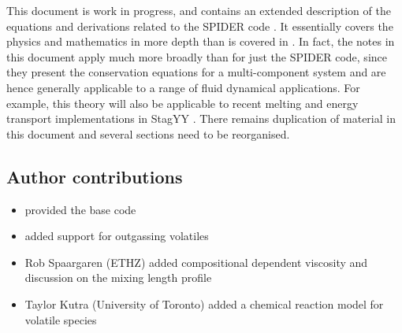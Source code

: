 This document is work in progress, and contains an extended description of the equations and derivations related to the SPIDER code \citep{BSW18}.  It essentially covers the physics and mathematics in more depth than is covered in \cite{ABE93,ABE95,BSW18}.  In fact, the notes in this document apply much more broadly than for just the SPIDER code, since they present the conservation equations for a multi-component system and are hence generally applicable to a range of fluid dynamical applications.  For example, this theory will also be applicable to recent melting and energy transport implementations in StagYY \citep{TACK08}.  There remains duplication of material in this document and several sections need to be reorganised.
\subsection{Author contributions}
\begin{itemize}
\item \cite{BSW18} provided the base code
\item \cite{BKW19} added support for outgassing volatiles
\item Rob Spaargaren (ETHZ) added compositional dependent viscosity and discussion on the mixing length profile
\item Taylor Kutra (University of Toronto) added a chemical reaction model for volatile species
\end{itemize}